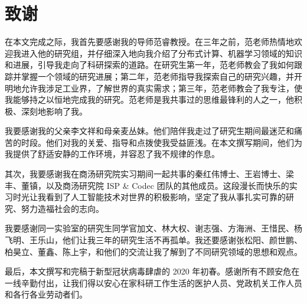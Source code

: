\chapter[致谢]{致\quad 谢}%
\thispagestyle{noheaderstyle}%
在本文完成之际，我首先要感谢我的导师范睿教授。在三年之前，范老师热情地欢迎我进入他的研究组，并仔细深入地向我介绍了分布式计算、机器学习领域的知识和进展，引导我走向了科研探索的道路。在研究生第一年，范老师教会了我如何跟踪并掌握一个领域的研究进展；第二年，范老师指导我探索自己的研究兴趣，并开明地允许我涉足工业界，了解世界的真实需求；第三年，范老师教会了我专注，使我能够持之以恒地完成我的研究。范老师是我共事过的思维最锋利的人之一，他积极、深刻地影响了我。

我要感谢我的父亲李文祥和母亲麦丛妹。他们陪伴我走过了研究生期间最迷茫和痛苦的时段。他们对我的关爱、指导和点拨使我受益匪浅。在本文撰写期间，他们为我提供了舒适安静的工作环境，并容忍了我不规律的作息。

其次，我要感谢我在商汤研究院实习期间一起共事的秦红伟博士、王岩博士、梁丰、董镇，以及商汤研究院 ISP \& Codec 团队的其他成员。这段漫长而快乐的实习时光让我看到了人工智能技术对世界的积极影响，坚定了我从事扎实可靠的研究、努力造福社会的志向。

我要感谢同一实验室的研究生同学官加文、林大权、谢志强、方海洲、王惜民、杨飞明、王乐山，他们让我三年的研究生活不再孤单。我还要感谢张松阳、颜世鹏、柏昊立、董鑫、陈上宇，和他们的交流让我了解到了不同研究领域的思想和观点。

最后，本文撰写和完稿于新型冠状病毒肆虐的 2020 年初春。感谢所有不顾安危在一线辛勤付出，让我们得以安心在家科研工作生活的医护人员、党政机关工作人员和各行各业劳动者们。
\cleardoublepage[plain]%
